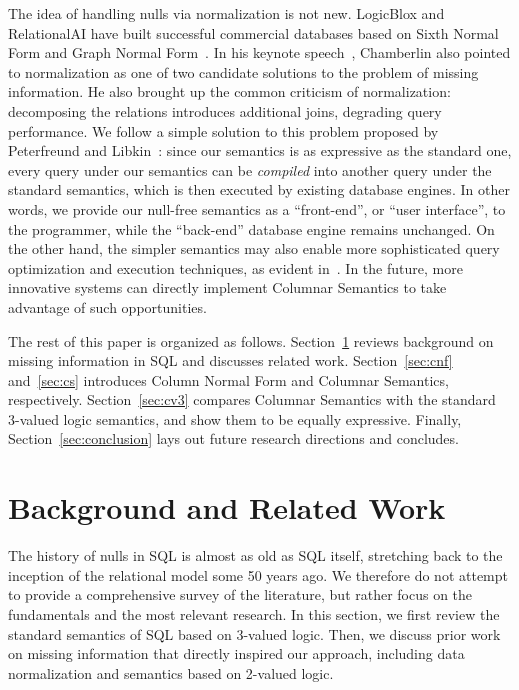 \documentclass[sigconf,nonacm]{acmart}
\begin{document}
The idea of handling nulls via normalization is not new.
LogicBlox and RelationalAI have built
 successful commercial databases based on Sixth Normal Form
 and Graph Normal Form~\cite{
  DBLP:books/daglib/0014409,
  RAIDocumentation,
  DBLP:conf/sigmod/ArefCGKOPVW15}.
In his keynote speech~\cite{DBLP:conf/sigmod/Chamberlin23},
 Chamberlin also pointed to normalization as 
 one of two candidate solutions 
 to the problem of missing information.
He also brought up the common criticism of normalization:
 decomposing the relations introduces additional joins,
 degrading query performance.
We follow a simple solution to this problem
 proposed by Peterfreund and Libkin~\cite{DBLP:conf/pods/LibkinP23}: 
 since our semantics is as expressive as the standard one,
 every query under our semantics can be {\em compiled} 
 into another query under the standard semantics,
 which is then executed by existing database engines.
In other words, we provide our null-free semantics as a
 ``front-end'', or ``user interface'', to the  programmer,
 while the ``back-end'' database engine remains unchanged.
On the other hand, the simpler semantics may also enable
 more sophisticated query optimization and execution techniques, 
 as evident in~\cite{DBLP:conf/pods/LibkinP23,DBLP:conf/sigmod/ArefCGKOPVW15,RAIDocumentation}.
In the future, more innovative systems can 
 directly implement Columnar Semantics 
 to take advantage of such opportunities.

The rest of this paper is organized as follows.
Section~\ref{sec:background} reviews background 
 on missing information in SQL and discusses related work.
Section~\ref{sec:cnf} and~\ref{sec:cs} introduces Column Normal Form 
 and Columnar Semantics, respectively.
Section~\ref{sec:cv3} compares Columnar Semantics with the standard 3-valued logic semantics, 
 and show them to be equally expressive.
Finally, Section~\ref{sec:conclusion}
 lays out future research directions and concludes.

\section{Background and Related Work}
\label{sec:background}

The history of nulls in SQL is almost as old as SQL itself,
 stretching back to the inception of the relational model some 50 years ago.
We therefore do not attempt to provide a comprehensive survey of the literature, 
 but rather focus on the fundamentals and the most relevant research.
In this section, we first review the standard semantics of SQL
 based on 3-valued logic.
Then, we discuss prior work on missing information that directly 
 inspired our approach,
 including data normalization and semantics based on 2-valued logic.
\end{document}
